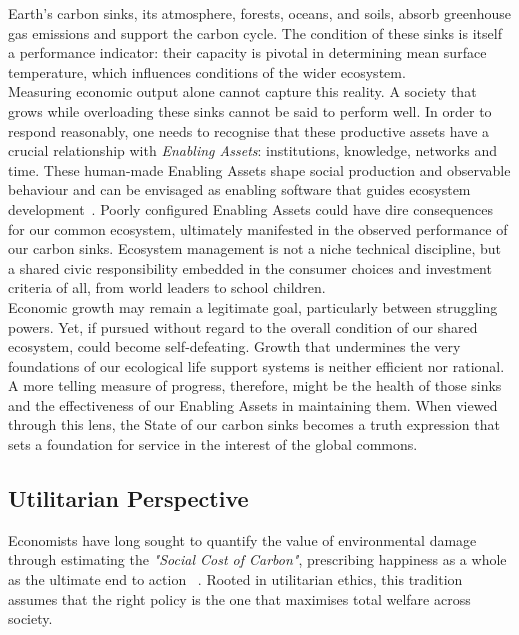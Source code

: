 \documentclass[12pt, oneside]{article}   	%
\begin{document}
Earth’s carbon sinks, its atmosphere, forests, oceans, and soils, absorb greenhouse gas emissions and support the carbon cycle.
The condition of these sinks is itself a performance indicator: their capacity is pivotal in determining mean surface temperature, which influences conditions of the wider ecosystem.\\
Measuring economic output alone cannot capture this reality.
A society that grows while overloading these sinks cannot be said to perform well.
In order to respond reasonably, one needs to recognise that these productive assets have a crucial relationship with \emph{Enabling Assets}: institutions, knowledge, networks and time.
These human-made Enabling Assets shape social production and observable behaviour and can be envisaged as enabling software that guides ecosystem development~\cite{pd3}.
Poorly configured Enabling Assets could have dire consequences for our common ecosystem, ultimately manifested in the observed performance of our carbon sinks.
Ecosystem management is not a niche technical discipline, but a shared civic responsibility embedded in the consumer choices and investment criteria of all, from world leaders to school children.\\

Economic growth may remain a legitimate goal, particularly between struggling powers.
Yet, if pursued without regard to the overall condition of our shared ecosystem, could become self-defeating.
Growth that undermines the very foundations of our ecological life support systems is neither efficient nor rational.
A more telling measure of progress, therefore, might be the health of those sinks and the effectiveness of our Enabling Assets in maintaining them.
When viewed through this lens, the State of our carbon sinks becomes a truth expression that sets a foundation for service in the interest of the global commons.\\

\subsection{Utilitarian Perspective}

Economists have long sought to quantify the value of environmental damage through estimating the \emph{"Social Cost of Carbon"}, prescribing happiness as a whole as the ultimate end to action ~\cite{hs1}.
Rooted in utilitarian ethics, this tradition assumes that the right policy is the one that maximises total welfare across society.\\
\end{document}
